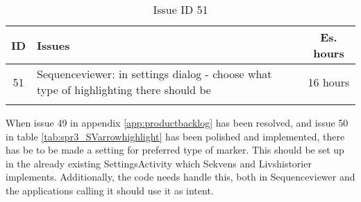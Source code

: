 \begin{longtable} { | c | p{12cm} | c | } 
\hline
	ID 	&	Issues	&		 Es. hours \\\hline
	51 	&	Sequenceviewer: in settings dialog - choose what type of highlighting there should be	&	16 hours \\\hline
\caption{Issue ID 51}
\label{tab:spr3_SVsettingsdialog}
\end{longtable}

When issue 49 in appendix \ref{app:productbacklog} has been resolved, and issue 50 in table \ref{tab:spr3_SVarrowhighlight} has been polished and implemented, there has be to be made a setting for preferred type of marker. This should be set up in the already existing SettingsActivity which Sekvens and Livshistorier implements. Additionally, the code needs handle this, both in Sequenceviewer and the applications calling it should use it as intent.